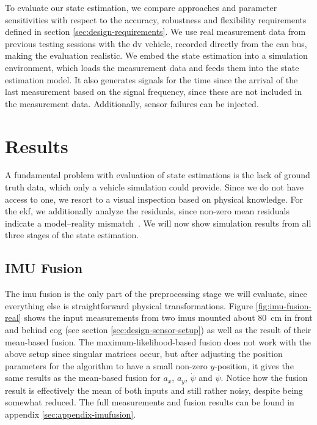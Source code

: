 To evaluate our state estimation, we compare approaches and parameter sensitivities with respect to the accuracy, robustness and flexibility requirements defined in section \ref{sec:design-requirements}. We use real measurement data from previous testing sessions with the \gls{dv} vehicle, recorded directly from the \gls{can} bus, making the evaluation realistic. We embed the state estimation into a simulation environment, which loads the measurement data and feeds them into the state estimation model. It also generates signals for the time since the arrival of the last measurement based on the signal frequency, since these are not included in the measurement data. Additionally, sensor failures can be injected.


\section{Results}
A fundamental problem with evaluation of state estimations is the lack of ground truth data, which only a vehicle simulation could provide. Since we do not have access to one, we resort to a visual inspection based on physical knowledge. For the \gls{ekf}, we additionally analyze the residuals, since non-zero mean residuals indicate a model--reality mismatch~\cite[p.~158]{AlexanderWischnewski.2019}. We will now show simulation results from all three stages of the state estimation.


\subsection{IMU Fusion}
The \gls{imu} fusion is the only part of the preprocessing stage we will evaluate, since everything else is straightforward physical transformations. Figure \ref{fig:imu-fusion-real} shows the input measurements from two \glspl{imu} mounted about \SI{80}{\centi\meter} in front and behind \gls{cog} (see section \ref{sec:design-sensor-setup}) as well as the result of their mean-based fusion. The maximum-likelihood-based fusion does not work with the above setup since singular matrices occur, but after adjusting the position parameters for the algorithm to have a small non-zero $y$-position, it gives the same results as the mean-based fusion for $a_x$, $a_y$, $\dot{\psi}$ and $\ddot{\psi}$. Notice how the fusion result is effectively the mean of both inputs and still rather noisy, despite being somewhat reduced. The full measurements and fusion results can be found in appendix \ref{sec:appendix-imufusion}.

